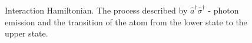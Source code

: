 \begin{figure}
\centering



\caption{Interaction Hamiltonian. The process described by $\hat{a}^{\dag}\hat{\sigma}^{\dag}$ - photon emission and the transition of the atom from the lower state to the upper state.}
\label{figPart1Ch2_2_4}
\end{figure}